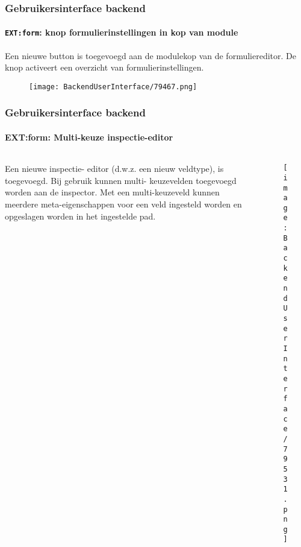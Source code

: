 \begin{frame}[fragile]
	\frametitle{Gebruikersinterface backend}
	\framesubtitle{\texttt{EXT:form}: knop formulierinstellingen in kop van module}

	Een nieuwe button is toegevoegd aan de modulekop van de formuliereditor.
	De knop activeert een overzicht van formulierinstellingen.

	\begin{figure}\vspace{-0.2cm}
		\texttt{[image: BackendUserInterface/79467.png]}
	\end{figure}

\end{frame}

\begin{frame}[fragile]
	\frametitle{Gebruikersinterface backend}
	\framesubtitle{{EXT:form}: Multi-keuze inspectie-editor}

	\begin{columns}[T]
		\begin{column}{0.35\textwidth}
			Een nieuwe inspectie- editor (d.w.z. een nieuw veldtype), is toegevoegd. Bij
			gebruik kunnen multi- keuzevelden toegevoegd worden aan de inspector.
			Met een multi-keuzeveld kunnen meerdere meta-eigenschappen voor een veld
			ingesteld worden en opgeslagen worden in het ingestelde pad.
		\end{column}

		\begin{column}{0.65\textwidth}
			\begin{figure}\vspace*{-0.6cm}
				\texttt{[image: BackendUserInterface/79531.png]}
			\end{figure}
		\end{column}
	\end{columns}

\end{frame}


